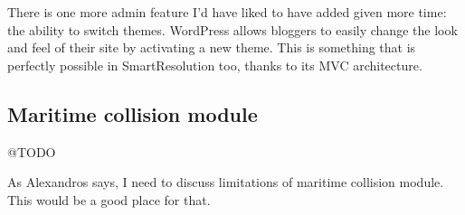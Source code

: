 There is one more admin feature I'd have liked to have added given more time: the ability to switch themes. WordPress allows bloggers to easily change the look and feel of their site by activating a new theme. This is something that is perfectly possible in SmartResolution too, thanks to its MVC architecture.

\subsection{Maritime collision module}

@TODO

As Alexandros says, I need to discuss limitations of maritime collision module. This would be a good place for that.